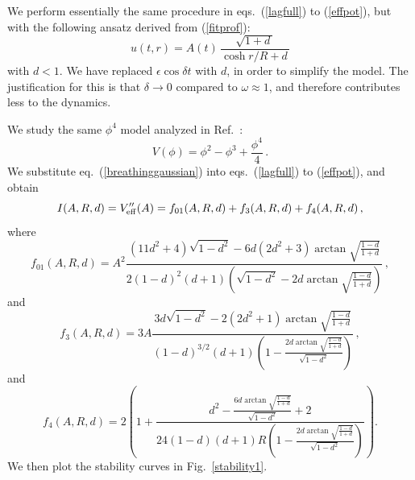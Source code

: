 \documentclass[11pt]{book}
\begin{document}
We perform essentially the same procedure in eqs.~(\ref{lagfull}) to (\ref{effpot}), but with the following ansatz derived from (\ref{fitprof}):
\begin{equation}\label{breathinggaussian}
  u(t,r) = A(t)\,\frac{\sqrt{1+d\,}}{\cosh r/R + d\,}
\end{equation}
with $d<1$. We have replaced $\epsilon\cos\delta t$ with $d$, in order to simplify the model. The justification for this is that $\delta\to 0$ compared to $\omega\approx 1$, and therefore contributes less to the dynamics.

We study the same $\phi^4$ model analyzed in Ref.~\cite{Gleiser:2008ty}:
\begin{equation}\label{siciliamodel}
  V(\phi) = \phi^2 - \phi^3 + \frac{\phi^4}{4}\,.
\end{equation}
We substitute eq.~(\ref{breathinggaussian}) into eqs.~(\ref{lagfull}) to (\ref{effpot}), and obtain
\begin{equation}
  I(A,R,d) = V_{\rm eff}''(A) = f_{01}(A,R,d) + f_3(A,R,d) + f_4(A,R,d)\,,
\end{equation}
where
\begin{equation}
  f_{01}(A,R,d)=A^2\frac{\left(11 d^2+4\right) \sqrt{1-d^2}-6 d \left(2 d^2+3\right) \arctan\sqrt{\frac{1-d}{1+d}}}{2 (1-d)^2 (d+1) \left(\sqrt{1-d^2}
      -2 d \arctan\sqrt{\frac{1-d}{1+d}}\right)}\,,
\end{equation}
and
\begin{equation}
  f_3(A,R,d)=3A\frac{3 d \sqrt{1-d^2}-2 \left(2 d^2+1\right) \arctan\sqrt{\frac{1-d}{1+d}}}{(1-d)^{3/2} (d+1) \left(1-\frac{2 d \arctan\sqrt{\frac{1-d}{1+d}}}{\sqrt{1-d^2}}\right)}\,,
\end{equation}
and
\begin{equation}
    f_4(A,R,d)=2 \left(1+\frac{d^2-\frac{6 d \arctan\sqrt{\frac{1-d}{1+d}}}{\sqrt{1-d^2}}+2}{24 (1-d) (d+1) R \left(1-\frac{2 d \arctan\sqrt{\frac{1-d}{1+d}}}{\sqrt{1-d^2}}\right)}\right).
\end{equation}
We then plot the stability curves in Fig.~\ref{stability1}.
\end{document}
